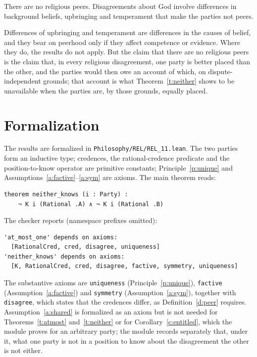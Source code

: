 \documentclass{situationist-preprint}
\begin{document}
\begin{objection}[No peers]
There are no religious peers. Disagreements about God involve differences in background beliefs, upbringing and temperament that make the parties not peers.
\end{objection}

\begin{reply}
Differences of upbringing and temperament are differences in the causes of belief, and they bear on peerhood only if they affect competence or evidence. Where they do, the results do not apply. But the claim that there are no religious peers is the claim that, in every religious disagreement, one party is better placed than the other, and the parties would then owe an account of which, on dispute-independent grounds; that account is what Theorem~\ref{t:neither} shows to be unavailable when the parties are, by those grounds, equally placed.
\end{reply}

\section{Formalization}

The results are formalized in \nolinkurl{Philosophy/REL/REL_11.lean}. The two parties form an inductive type; credences, the rational-credence predicate and the position-to-know operator are primitive constants; Principle~\ref{p:unique} and Assumptions~\ref{a:factive}--\ref{a:sym} are axioms. The main theorem reads:

\begin{lstlisting}
theorem neither_knows (i : Party) :
    ¬ K i (Rational .A) ∧ ¬ K i (Rational .B)
\end{lstlisting}

The checker reports (namespace prefixes omitted):

\begin{lstlisting}
'at_most_one' depends on axioms:
  [RationalCred, cred, disagree, uniqueness]
'neither_knows' depends on axioms:
  [K, RationalCred, cred, disagree, factive, symmetry, uniqueness]
\end{lstlisting}

The substantive axioms are \texttt{uniqueness} (Principle~\ref{p:unique}), \texttt{factive} (Assumption~\ref{a:factive}) and \texttt{symmetry} (Assumption~\ref{a:sym}), together with \texttt{disagree}, which states that the credences differ, as Definition~\ref{d:peer} requires. Assumption~\ref{a:shared} is formalized as an axiom but is not needed for Theorems~\ref{t:atmost} and~\ref{t:neither} or for Corollary~\ref{c:entitled}, which the module proves for an arbitrary party; the module records separately that, under it, what one party is not in a position to know about the disagreement the other is not either.
\end{document}
